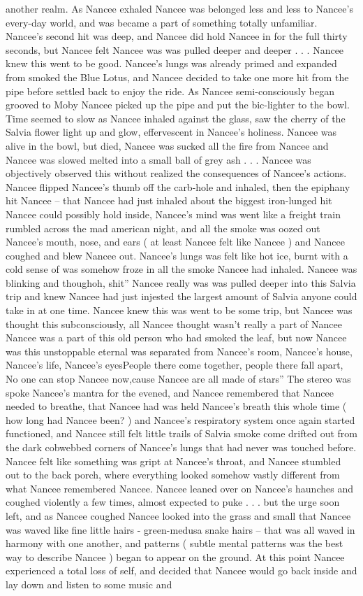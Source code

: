 \documentclass[12pt]{book}
\begin{document}
another realm. As Nancee exhaled Nancee was belonged less and less to Nancee's every-day world, and was became a part of something totally unfamiliar. Nancee's second hit was deep, and Nancee did hold Nancee in for the full thirty seconds, but Nancee felt Nancee was was pulled deeper and deeper  . . .  Nancee knew this went to be good. Nancee's lungs was already primed and expanded from smoked the Blue Lotus, and Nancee decided to take one more hit from the pipe before settled back to enjoy the ride. As Nancee semi-consciously began grooved to Moby Nancee picked up the pipe and put the bic-lighter to the bowl. Time seemed to slow as Nancee inhaled against the glass, saw the cherry of the Salvia flower light up and glow, effervescent in Nancee's holiness. Nancee was alive in the bowl, but died, Nancee was sucked all the fire from Nancee and Nancee was slowed melted into a small ball of grey ash  . . .  Nancee was objectively observed this without realized the consequences of Nancee's actions. Nancee flipped Nancee's thumb off the carb-hole and inhaled, then the epiphany hit Nancee -- that Nancee had just inhaled about the biggest iron-lunged hit Nancee could possibly hold inside, Nancee's mind was went like a freight train rumbled across the mad american night, and all the smoke was oozed out Nancee's mouth, nose, and ears ( at least Nancee felt like Nancee ) and Nancee coughed and blew Nancee out. Nancee's lungs was felt like hot ice, burnt with a cold sense of was somehow froze in all the smoke Nancee had inhaled. Nancee was blinking and thoughoh, shit'' Nancee really was was pulled deeper into this Salvia trip and knew Nancee had just injested the largest amount of Salvia anyone could take in at one time. Nancee knew this was went to be some trip, but Nancee was thought this subconsciously, all Nancee thought wasn't really a part of Nancee Nancee was a part of this old person who had smoked the leaf, but now Nancee was this unstoppable eternal was separated from Nancee's room, Nancee's house, Nancee's life, Nancee's eyesPeople there come together, people there fall apart, No one can stop Nancee now,cause Nancee are all made of stars'' The stereo was spoke Nancee's mantra for the evened, and Nancee remembered that Nancee needed to breathe, that Nancee had was held Nancee's breath this whole time ( how long had Nancee been? ) and Nancee's respiratory system once again started functioned, and Nancee still felt little trails of Salvia smoke come drifted out from the dark cobwebbed corners of Nancee's lungs that had never was touched before. Nancee felt like something was gript at Nancee's throat, and Nancee stumbled out to the back porch, where everything looked somehow vastly different from what Nancee remembered Nancee. Nancee leaned over on Nancee's haunches and coughed violently a few times, almost expected to puke  . . .  but the urge soon left, and as Nancee coughed Nancee looked into the grass and small that Nancee was waved like fine little hairs - green-medusa snake hairs -- that was all waved in harmony with one another, and patterns ( subtle mental patterns was the best way to describe Nancee ) began to appear on the ground. At this point Nancee experienced a total loss of self, and decided that Nancee would go back inside and lay down and listen to some music and 
\end{document}
